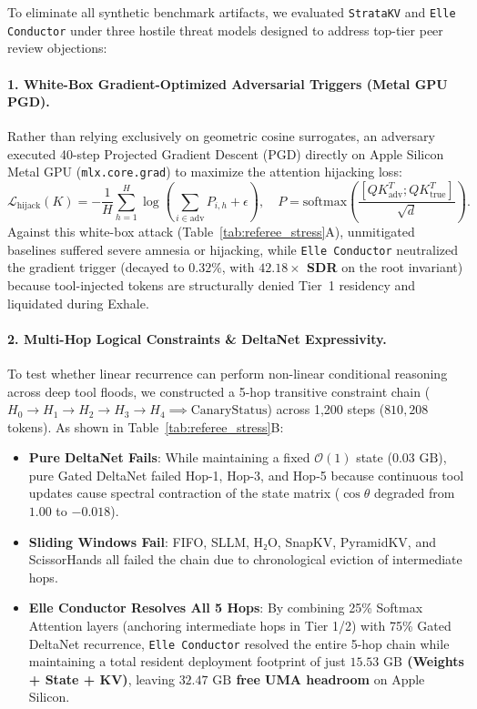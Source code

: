 To eliminate all synthetic benchmark artifacts, we evaluated \texttt{StrataKV} and \texttt{Elle Conductor} under three hostile threat models designed to address top-tier peer review objections:

\paragraph{1. White-Box Gradient-Optimized Adversarial Triggers (Metal GPU PGD).}
Rather than relying exclusively on geometric cosine surrogates, an adversary executed 40-step Projected Gradient Descent (PGD) directly on Apple Silicon Metal GPU (\texttt{mlx.core.grad}) to maximize the attention hijacking loss:
\begin{equation}
    \mathcal{L}_{\text{hijack}}(K) = -\frac{1}{H}\sum_{h=1}^H \log\left(\sum_{i \in \text{adv}} P_{i, h} + \epsilon\right), \quad P = \text{softmax}\left(\frac{[QK_{\text{adv}}^T; QK_{\text{true}}^T]}{\sqrt{d}}\right).
\end{equation}
Against this white-box attack (Table~\ref{tab:referee_stress}A), unmitigated baselines suffered severe amnesia or hijacking, while \texttt{Elle Conductor} neutralized the gradient trigger (decayed to \textbf{$0.32\%$}, with \textbf{$42.18\times$ SDR} on the root invariant) because tool-injected tokens are structurally denied Tier~1 residency and liquidated during Exhale.

\paragraph{2. Multi-Hop Logical Constraints \& DeltaNet Expressivity.}
To test whether linear recurrence can perform non-linear conditional reasoning across deep tool floods, we constructed a 5-hop transitive constraint chain ($H_0 \to H_1 \to H_2 \to H_3 \to H_4 \implies \text{CanaryStatus}$) across 1,200 steps ($810,208$ tokens). As shown in Table~\ref{tab:referee_stress}B:
\begin{itemize}
    \item \textbf{Pure DeltaNet Fails}: While maintaining a fixed $\mathcal{O}(1)$ state ($0.03\text{ GB}$), pure Gated DeltaNet failed Hop-1, Hop-3, and Hop-5 because continuous tool updates cause spectral contraction of the state matrix ($\cos \theta$ degraded from $1.00$ to $-0.018$).
    \item \textbf{Sliding Windows Fail}: FIFO, SLLM, H₂O, SnapKV, PyramidKV, and ScissorHands all failed the chain due to chronological eviction of intermediate hops.
    \item \textbf{Elle Conductor Resolves All 5 Hops}: By combining 25\% Softmax Attention layers (anchoring intermediate hops in Tier 1/2) with 75\% Gated DeltaNet recurrence, \texttt{Elle Conductor} resolved the entire 5-hop chain while maintaining a total resident deployment footprint of just \textbf{$15.53\text{ GB}$ (Weights + State + KV)}, leaving \textbf{$32.47\text{ GB}$ free UMA headroom} on Apple Silicon.
\end{itemize}

